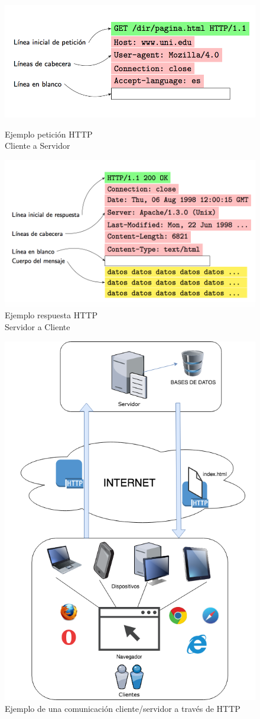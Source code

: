 \begin{figure}[h]
\begin{minipage}[b]{0.5\linewidth}
\centering
\includegraphics[width=1\linewidth]{chapters/images/peticionhttp.png}
\caption{Ejemplo petición HTTP\\ Cliente a Servidor}
\label{fig:figura1}
\end{minipage}
\hspace{0.5cm}
\begin{minipage}[b]{0.5\linewidth}
\centering
\includegraphics[width=1\linewidth]{chapters/images/respuestahttp.png}
\caption{Ejemplo respuesta HTTP\\ Servidor a Cliente}
\label{fig:figura2}
\end{minipage}
\end{figure}
\begin{figure}[h]
    \centering
    \includegraphics[width=0.5\columnwidth]{chapters/images/web.png}
    \caption{Ejemplo de una comunicación cliente/servidor a través de HTTP}
    \label{fig:httpprotocol}
\end{figure}

